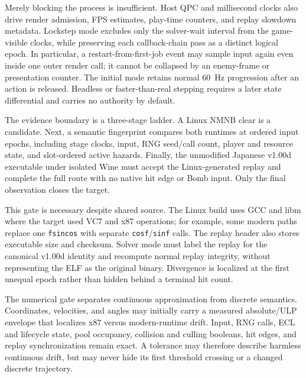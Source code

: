 \documentclass[10pt]{article}
\newcommand{\code}[1]{\texttt{#1}}
\begin{document}
Merely blocking the process is insufficient.  Host QPC and millisecond clocks
also drive render admission, FPS estimates, play-time counters, and replay
slowdown metadata.  Lockstep mode excludes only the solver-wait interval from
the game-visible clocks, while preserving each callback-chain pass as a
distinct logical epoch.  In particular, a restart-from-first-job event may
sample input again even inside one outer render call; it cannot be collapsed by
an enemy-frame or presentation counter.  The initial mode retains normal
60~Hz progression after an action is released.  Headless or faster-than-real
stepping requires a later state differential and carries no authority by
default.

The evidence boundary is a three-stage ladder.  A Linux NMNB clear is a
candidate.  Next, a semantic fingerprint compares both runtimes at ordered
input epochs, including stage clocks, input, RNG seed/call count, player and
resource state, and slot-ordered active hazards.  Finally, the unmodified
Japanese v1.00d executable under isolated Wine must accept the Linux-generated
replay and complete the full route with no native hit edge or Bomb input.  Only
the final observation closes the target.

This gate is necessary despite shared source.  The Linux build uses GCC and
libm where the target used VC7 and x87 operations; for example, some modern
paths replace one \code{fsincos} with separate \code{cosf}/\code{sinf} calls.
The replay header also stores executable size and checksum.  Solver mode must
label the replay for the canonical v1.00d identity and recompute normal replay
integrity, without representing the ELF as the original binary.  Divergence is
localized at the first unequal epoch rather than hidden behind a terminal hit
count.

The numerical gate separates continuous approximation from discrete
semantics.  Coordinates, velocities, and angles may initially carry a measured
absolute/ULP envelope that localizes x87 versus modern-runtime drift.  Input,
RNG calls, ECL and lifecycle state, pool occupancy, collision and culling
booleans, hit edges, and replay synchronization remain exact.  A tolerance may
therefore describe harmless continuous drift, but may never hide its first
threshold crossing or a changed discrete trajectory.
\end{document}
